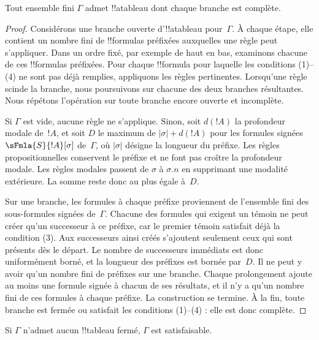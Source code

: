\documentclass[../../../include/open-logic-section]{subfiles}
\begin{document}
\begin{prop}
  Tout ensemble fini $\Gamma$ admet !!a{tableau} dont chaque branche
  est complète.
\end{prop}

\begin{proof}
  Considérons une branche ouverte d'!!a{tableau} pour~$\Gamma$. À
  chaque étape, elle contient un nombre fini de !!{formula}s préfixées
  auxquelles une règle peut s'appliquer. Dans un ordre fixé, par
  exemple de haut en bas, examinons chacune de ces !!{formula}s
  préfixées. Pour chaque !!{formula} pour laquelle les conditions
  (1)--(4) ne sont pas déjà remplies, appliquons les règles
  pertinentes. Lorsqu'une règle scinde la branche, nous
  poursuivons sur chacune des deux branches résultantes. Nous
  répétons l'opération sur toute branche encore ouverte et
  incomplète.

  Si $\Gamma$ est vide, aucune règle ne s'applique. Sinon,
  soit $d(!A)$ la profondeur modale de~$!A$, et soit $D$
  le maximum de $|\sigma|+d(!A)$ pour les formules signées
  $\sFmla{S}{!A}[\sigma]$ de~$\Gamma$, où $|\sigma|$ désigne
  la longueur du préfixe. Les règles propositionnelles conservent
  le préfixe et ne font pas croître la profondeur modale. Les
  règles modales passent de $\sigma$ à $\sigma.n$ en supprimant
  une modalité extérieure. La somme reste donc au plus égale
  à~$D$.

  Sur une branche, les formules à chaque préfixe proviennent de
  l'ensemble fini des sous-formules signées de~$\Gamma$. Chacune
  des formules qui exigent un témoin ne peut créer qu'un
  successeur à ce préfixe, car le premier témoin satisfait
  déjà la condition (3). Aux successeurs ainsi créés s'ajoutent
  seulement ceux qui sont présents dès le départ. Le nombre de
  successeurs immédiats est donc uniformément borné, et la
  longueur des préfixes est bornée par~$D$. Il ne peut y avoir
  qu'un nombre fini de préfixes sur une branche. Chaque
  prolongement ajoute au moins une formule signée à chacun de
  ses résultats, et il n'y a qu'un nombre fini de ces formules
  à chaque préfixe. La construction se termine. À la fin, toute branche est
  fermée ou satisfait les conditions (1)--(4) : elle est donc
  complète.
\end{proof}

\begin{thm}[Complétude]
  Si $\Gamma$ n'admet aucun !!{tableau} fermé, $\Gamma$ est
  satisfaisable.
\end{thm}
\end{document}
